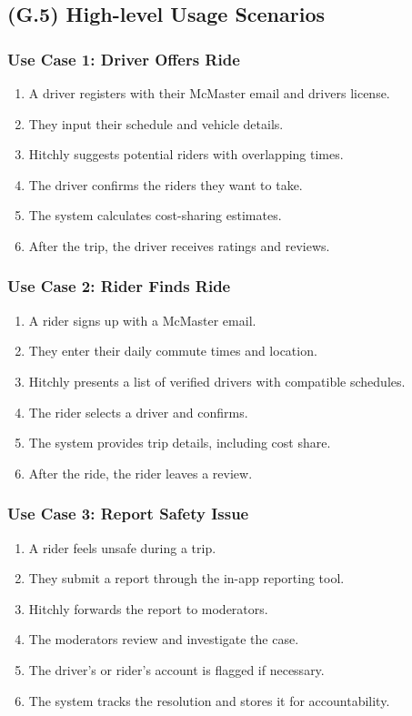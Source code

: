 \documentclass[12pt,letterpaper]{article}
\begin{document}
\subsection{(G.5) High-level Usage Scenarios}

\subsubsection*{Use Case 1: Driver Offers Ride}
\begin{enumerate}
    \item A driver registers with their McMaster email and drivers license.
    \item They input their schedule and vehicle details.
    \item Hitchly suggests potential riders with overlapping times.
    \item The driver confirms the riders they want to take.
    \item The system calculates cost-sharing estimates.
    \item After the trip, the driver receives ratings and reviews.
\end{enumerate}

\subsubsection*{Use Case 2: Rider Finds Ride}
\begin{enumerate}
    \item A rider signs up with a McMaster email.
    \item They enter their daily commute times and location.
    \item Hitchly presents a list of verified drivers with compatible schedules.
    \item The rider selects a driver and confirms.
    \item The system provides trip details, including cost share.
    \item After the ride, the rider leaves a review.
\end{enumerate}

\subsubsection*{Use Case 3: Report Safety Issue}
\begin{enumerate}
    \item A rider feels unsafe during a trip.
    \item They submit a report through the in-app reporting tool.
    \item Hitchly forwards the report to moderators.
    \item The moderators review and investigate the case.
    \item The driver’s or rider’s account is flagged if necessary.
    \item The system tracks the resolution and stores it for accountability.
\end{enumerate}
\end{document}

